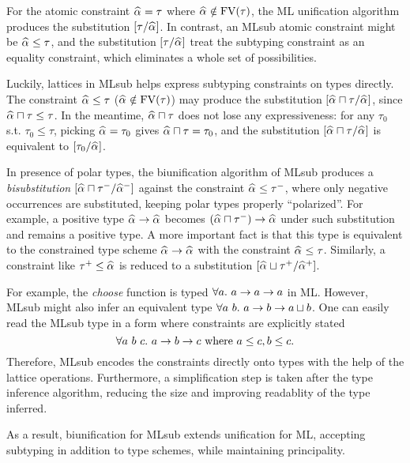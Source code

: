 For the atomic constraint $\al = \tau$ where $\al \notin \text{FV}(\tau)$,
the ML unification algorithm produces the substitution $[\tau/\al]$.
In contrast, an MLsub atomic constraint might be $\al \le \tau$,
and the substitution $[\tau/\al]$ treat the subtyping constraint as an equality constraint,
which eliminates a whole set of possibilities.

Luckily, lattices in MLsub helps express subtyping constraints on types directly.
The constraint $\al \le \tau$ ($\al \notin \text{FV}(\tau)$) may produce the substitution
$[\al \sqcap \tau/\al]$, since $\al \sqcap \tau \le \tau$.
In the meantime, $\al \sqcap \tau$ does not lose any expressiveness:
for any $\tau_0$ s.t. $\tau_0 \le \tau$,
picking $\al = \tau_0$ gives $\al \sqcap \tau = \tau_0$,
and the substitution $[\al \sqcap \tau/\al]$ is equivalent to $[\tau_0/\al]$.

In presence of polar types, the biunification algorithm of MLsub
produces a \emph{bisubstitution} $[\al \sqcap \tau^-/\al^-]$
against the constraint $\al \le \tau^-$,
where only negative occurrences are substituted,
keeping polar types properly ``polarized''.
For example, a positive type $\al \to \al$ becomes $(\al \sqcap \tau^-) \to \al$
under such substitution and remains a positive type.
A more important fact is that this type is equivalent to
the constrained type scheme $\al \to \al$ with the constraint $\al \le \tau$.
Similarly, a constraint like $\tau^+ \le \al$ is reduced to
a substitution $[\al \sqcup \tau^+/\al^+]$.

For example, the \emph{choose} function is typed $\all a \to a \to a$ in ML.
However, MLsub might also infer an equivalent type
$\all[a~b] a \to b \to a \sqcup b$.
One can easily read the MLsub type in a form
where constraints are explicitly stated
\[\all[a~b~c] a \to b \to c \text{ where } a \le c, b \le c.\]
Therefore, MLsub encodes the constraints directly onto types with the help of
the lattice operations.
Furthermore, a simplification step is taken after the type inference algorithm,
reducing the size and improving readablity of the type inferred.

As a result, biunification for MLsub extends unification for ML,
accepting subtyping in addition to type schemes,
while maintaining principality.

